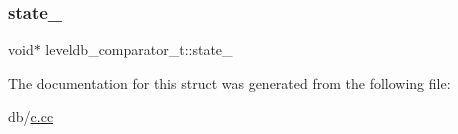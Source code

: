 \subsubsection{\texorpdfstring{state\_}{state\_}}
{\footnotesize\ttfamily void$\ast$ leveldb\+\_\+comparator\+\_\+t\+::state\+\_\+}



The documentation for this struct was generated from the following file\+:\begin{DoxyCompactItemize}
\item 
db/\mbox{\hyperlink{c_8cc}{c.\+cc}}\end{DoxyCompactItemize}
